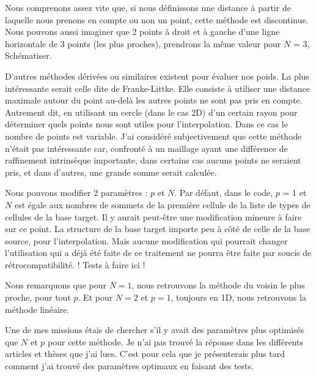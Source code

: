 
Nous comprenons assez vite que, si nous définissons une distance à partir de laquelle nous prenons en compte ou non un point, cette méthode est discontinue.
Nous pouvons aussi imaginer que 2 points à droit et à gauche d'une ligne horizontale de 3 points (les plus proches), prendrons la même valeur pour \( N \) = 3, Schématiser. 

D'autres méthodes dérivées ou similaires existent pour évaluer nos poids. La plus intéressante serait celle dite de Franke-Littke. Elle consiste à utiliser une distance maximale autour du point au-delà les autres points ne sont pas pris en compte. Autrement dit, en utilisant un cercle (dans le cas 2D) d'un certain rayon pour déterminer quels points nous sont utiles pour l'interpolation. Dans ce cas le nombre de points est variable.
J'ai considéré subjectivement que cette méthode n'était pas intéressante car, confronté à un maillage ayant une différence de raffinement intrinsèque importante, dans certains cas aucuns points ne seraient pris, et dans d'autres, une grande somme serait calculée.

Nous pouvons modifier 2 paramètres : \(p\) et \(N\).
Par défaut, dans le code, \(p\) = 1 et \(N\) est égale aux nombres de sommets de la première cellule de la liste de types de cellules de la base target. Il y aurait peut-être une modification mineure à faire sur ce point. La structure de la base target importe peu à côté de celle de la base source, pour l'interpolation. Mais aucune modification qui pourrait changer l'utilisation qui a déjà été faite de ce traitement ne pourra être faite par soucis de rétrocompatibilité. ! Tests à faire ici !



Nous remarquons que pour \( N = 1 \), nous retrouvons la méthode du voisin le plus proche, pour tout \( p \).
Et pour \( N = 2 \) et \( p = 1 \), toujours en 1D, nous retrouvons la méthode linéaire.

Une de mes missions étais de chercher s'il y avait des paramètres plus optimisés que \(N\) et \(p\) pour cette méthode. Je n'ai pas trouvé la réponse dans les différents articles et thèses que j'ai lues. C'est pour cela que je présenterais plus tard comment j'ai trouvé des paramètres optimaux en faisant des tests.


